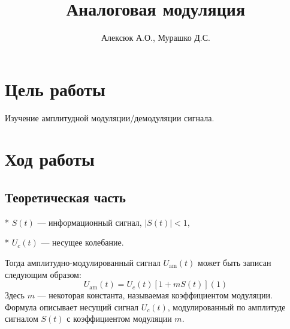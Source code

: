 \documentclass[a4paper, 12pt]{article}
\author{Алексюк А.О., Мурашко Д.С.}
\title{Аналоговая модуляция}
\begin{document}
\maketitle
\tableofcontents
\pagebreak

\section{Цель работы}
Изучение амплитудной модуляции/демодуляции сигнала.

\section{Ход работы}

\subsection{Теоретическая часть}
* $S(t)$ — информационный сигнал, $|S(t)|<1$,

* $U_c(t)$ — несущее колебание.

Тогда амплитудно-модулированный сигнал $U_\text{am}(t)$ может быть записан следующим образом:
$$U_\text{am}(t)=U_c(t)[1+mS(t)] (1)$$
Здесь $m$ — некоторая константа, называемая коэффициентом модуляции. Формула описывает несущий сигнал $U_c(t)$, модулированный по амплитуде сигналом $S(t)$ с коэффициентом модуляции $m$.
\end{document}
